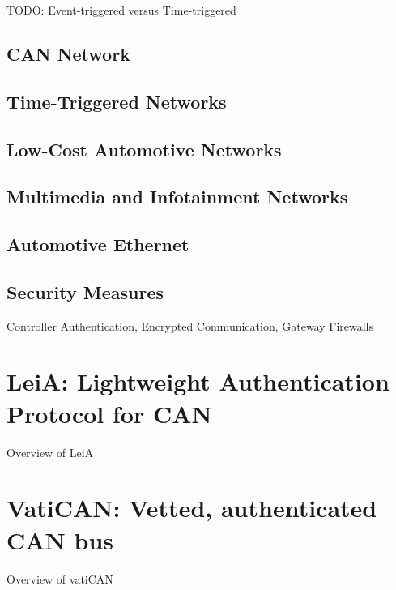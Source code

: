 TODO: Event-triggered versus Time-triggered

\subsection{CAN Network}

\subsection{Time-Triggered Networks}

\subsection{Low-Cost Automotive Networks}

\subsection{Multimedia and Infotainment Networks}

\subsection{Automotive Ethernet}

\subsection{Security Measures}

Controller Authentication, Encrypted Communication, Gateway
Firewalls \cite{Lemke2006}


\section{LeiA: Lightweight Authentication Protocol for CAN}
\label{sec:leia}

Overview of LeiA \cite{Radu2016}


\section{VatiCAN: Vetted, authenticated CAN bus}
\label{sec:vatican}

Overview of vatiCAN \cite{Nurnberger2016}

